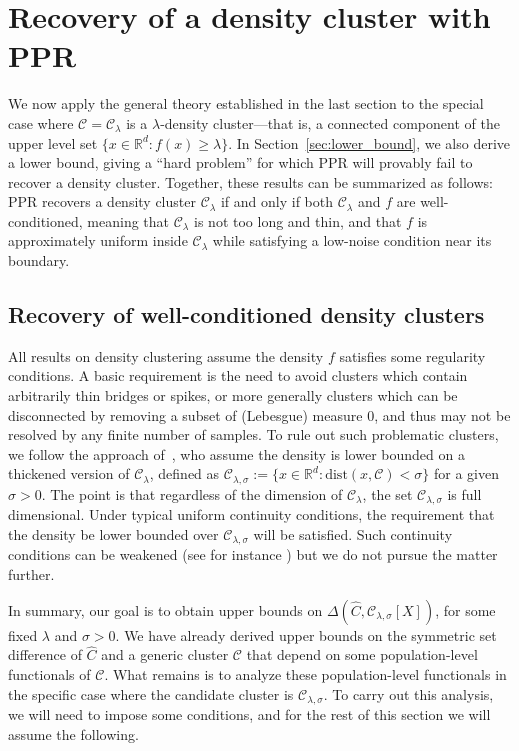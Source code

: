 \documentclass[11pt,twoside]{article}
\newcommand{\Reals}{\mathbb{R}}
\newcommand{\1}{\mathbf{1}}
\newcommand{\Rd}{\Reals^d}
\newcommand{\mc}[1]{\mathcal{#1}}
\newcommand{\wh}[1]{\widehat{#1}}
\newcommand{\dist}{\mathrm{dist}}
\begin{document}
\section{Recovery of a density cluster with PPR}
\label{sec:ppr_density_cluster}
We now apply the general theory established in the last section to the special case where $\mc{C} = \mc{C}_{\lambda}$ is a $\lambda$-density cluster---that is, a connected component of the upper level set $\{x \in \Rd: f(x) \geq \lambda\}$. In Section~\ref{sec:lower_bound}, we also derive a lower bound, giving a ``hard problem'' for which PPR will provably fail to recover a density cluster. Together, these results can be summarized as follows: PPR recovers a density cluster $\mc{C}_{\lambda}$ if and only if both $\mc{C}_{\lambda}$ and $f$ are well-conditioned, meaning that $\mc{C}_{\lambda}$ is not too long and thin, and that $f$ is approximately uniform inside $\mc{C}_{\lambda}$ while satisfying a low-noise condition near its boundary.

\subsection{Recovery of well-conditioned density clusters}
\label{subsec:recovery_well-conditioned_density_clusters}

All results on density clustering assume the density $f$ satisfies some regularity conditions. A basic requirement is the need to avoid clusters which contain arbitrarily thin bridges or spikes, or more generally clusters which can be disconnected by removing a subset of (Lebesgue) measure $0$, and thus may not be resolved by any finite number of samples. To rule out such problematic clusters, we follow the approach of~\cite{chaudhuri2010}, who assume the density is lower bounded on a thickened version of $\mc{C}_{\lambda}$, defined as $\mc{C}_{\lambda,\sigma} := \{x \in \Reals^d: \dist(x,\mc{C}) < \sigma\}$ for a given $\sigma > 0$. The point is that regardless of the dimension of $\mc{C}_{\lambda}$, the set $\mc{C}_{\lambda,\sigma}$ is full dimensional. Under typical uniform continuity conditions, the requirement that the density be lower bounded over $\mc{C}_{\lambda,\sigma}$ will be satisfied. Such continuity conditions can be weakened (see for instance \citet{rinaldo2010,steinwart2015}) but we do not pursue the matter further.

In summary, our goal is to obtain upper bounds on $\Delta(\wh{C},\mc{C}_{\lambda,\sigma}[X])$, for some fixed $\lambda$ and $\sigma > 0$. We have already derived upper bounds on the symmetric set difference of $\wh{C}$ and a generic cluster $\mc{C}$ that depend on some population-level functionals of $\mc{C}$. What remains is to analyze these population-level functionals in the specific case where the candidate cluster is $\mc{C}_{\lambda,\sigma}$. To carry out this analysis, we will need to impose some conditions, and for the rest of this section we will assume the following.
\end{document}
